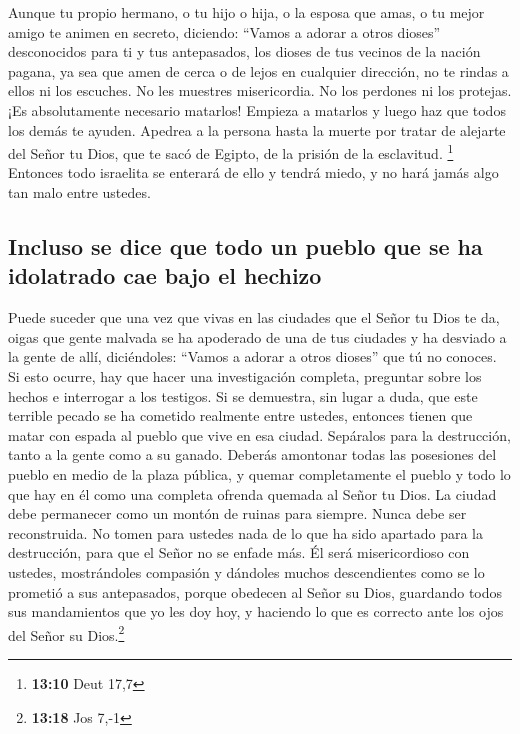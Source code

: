  Aunque tu propio hermano, o tu hijo o hija, o la esposa
que amas, o tu mejor amigo te animen en secreto, diciendo: ``Vamos a
adorar a otros dioses'' desconocidos para ti y tus antepasados,
 los dioses de tus vecinos de la nación pagana, ya sea que
amen de cerca o de lejos en cualquier dirección,  no te
rindas a ellos ni los escuches. No les muestres misericordia. No los
perdones ni los protejas.  ¡Es absolutamente necesario
matarlos! Empieza a matarlos y luego haz que todos los demás te ayuden.
 Apedrea a la persona hasta la muerte por tratar de
alejarte del Señor tu Dios, que te sacó de Egipto, de la prisión de la
esclavitud. \footnote{\textbf{13:10} Deut 17,7}  Entonces
todo israelita se enterará de ello y tendrá miedo, y no hará jamás algo
tan malo entre ustedes.

\hypertarget{incluso-se-dice-que-todo-un-pueblo-que-se-ha-idolatrado-cae-bajo-el-hechizo}{%
\subsection{Incluso se dice que todo un pueblo que se ha idolatrado cae
bajo el
hechizo}\label{incluso-se-dice-que-todo-un-pueblo-que-se-ha-idolatrado-cae-bajo-el-hechizo}}

 Puede suceder que una vez que vivas en las ciudades que
el Señor tu Dios te da, oigas  que gente malvada se ha
apoderado de una de tus ciudades y ha desviado a la gente de allí,
diciéndoles: ``Vamos a adorar a otros dioses'' que tú no conoces.
 Si esto ocurre, hay que hacer una investigación
completa, preguntar sobre los hechos e interrogar a los testigos. Si se
demuestra, sin lugar a duda, que este terrible pecado se ha cometido
realmente entre ustedes,  entonces tienen que matar con
espada al pueblo que vive en esa ciudad. Sepáralos para la destrucción,
tanto a la gente como a su ganado.  Deberás amontonar
todas las posesiones del pueblo en medio de la plaza pública, y quemar
completamente el pueblo y todo lo que hay en él como una completa
ofrenda quemada al Señor tu Dios. La ciudad debe permanecer como un
montón de ruinas para siempre. Nunca debe ser reconstruida.
 No tomen para ustedes nada de lo que ha sido apartado
para la destrucción, para que el Señor no se enfade más. Él será
misericordioso con ustedes, mostrándoles compasión y dándoles muchos
descendientes como se lo prometió a sus antepasados, 
porque obedecen al Señor su Dios, guardando todos sus mandamientos que
yo les doy hoy, y haciendo lo que es correcto ante los ojos del Señor su
Dios.\footnote{\textbf{13:18} Jos 7,-1}

